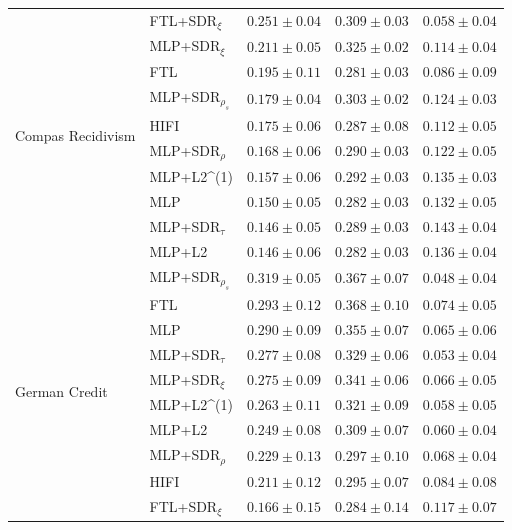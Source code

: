 \begin{tabular}{lllll}
\cline{1-5}
\multirow[t]{10}{*}{Compas Recidivism} & FTL+SDR$_{\xi}$ & $0.251 \pm0.04$ & $0.309 \pm0.03$ & $0.058 \pm0.04$ \\
 & MLP+SDR$_{\xi}$ & $0.211 \pm0.05$ & $0.325 \pm0.02$ & $0.114 \pm0.04$ \\
 & FTL & $0.195 \pm0.11$ & $0.281 \pm0.03$ & $0.086 \pm0.09$ \\
 & MLP+SDR$_{\rho_s}$ & $0.179 \pm0.04$ & $0.303 \pm0.02$ & $0.124 \pm0.03$ \\
 & HIFI & $0.175 \pm0.06$ & $0.287 \pm0.08$ & $0.112 \pm0.05$ \\
 & MLP+SDR$_{\rho}$ & $0.168 \pm0.06$ & $0.290 \pm0.03$ & $0.122 \pm0.05$ \\
 & MLP+L2^{(1)} & $0.157 \pm0.06$ & $0.292 \pm0.03$ & $0.135 \pm0.03$ \\
 & MLP & $0.150 \pm0.05$ & $0.282 \pm0.03$ & $0.132 \pm0.05$ \\
 & MLP+SDR$_{\tau}$ & $0.146 \pm0.05$ & $0.289 \pm0.03$ & $0.143 \pm0.04$ \\
 & MLP+L2 & $0.146 \pm0.06$ & $0.282 \pm0.03$ & $0.136 \pm0.04$ \\
\cline{1-5}
\multirow[t]{10}{*}{German Credit} & MLP+SDR$_{\rho_s}$ & $0.319 \pm0.05$ & $0.367 \pm0.07$ & $0.048 \pm0.04$ \\
 & FTL & $0.293 \pm0.12$ & $0.368 \pm0.10$ & $0.074 \pm0.05$ \\
 & MLP & $0.290 \pm0.09$ & $0.355 \pm0.07$ & $0.065 \pm0.06$ \\
 & MLP+SDR$_{\tau}$ & $0.277 \pm0.08$ & $0.329 \pm0.06$ & $0.053 \pm0.04$ \\
 & MLP+SDR$_{\xi}$ & $0.275 \pm0.09$ & $0.341 \pm0.06$ & $0.066 \pm0.05$ \\
 & MLP+L2^{(1)} & $0.263 \pm0.11$ & $0.321 \pm0.09$ & $0.058 \pm0.05$ \\
 & MLP+L2 & $0.249 \pm0.08$ & $0.309 \pm0.07$ & $0.060 \pm0.04$ \\
 & MLP+SDR$_{\rho}$ & $0.229 \pm0.13$ & $0.297 \pm0.10$ & $0.068 \pm0.04$ \\
 & HIFI & $0.211 \pm0.12$ & $0.295 \pm0.07$ & $0.084 \pm0.08$ \\
 & FTL+SDR$_{\xi}$ & $0.166 \pm0.15$ & $0.284 \pm0.14$ & $0.117 \pm0.07$ \\
\cline{1-5}
\bottomrule
\end{tabular}
